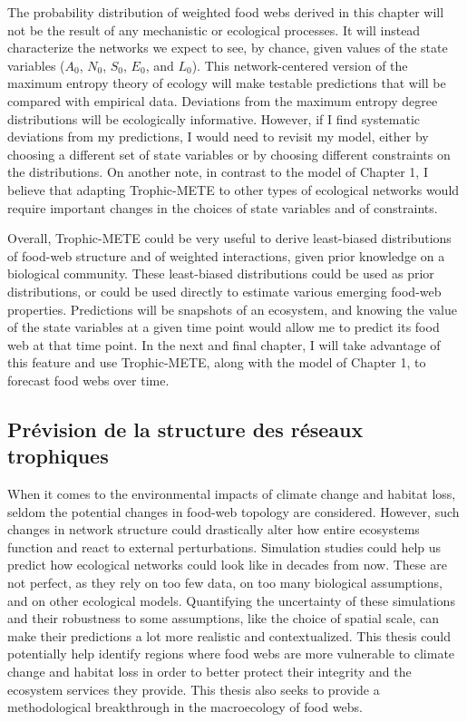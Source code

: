 The probability distribution of weighted food webs derived in this chapter will
not be the result of any mechanistic or ecological processes. It will instead
characterize the networks we expect to see, by chance, given values of the state
variables ($A_0$, $N_0$, $S_0$, $E_0$, and $L_0$). This network-centered version
of the maximum entropy theory of ecology will make testable predictions that
will be compared with empirical data. Deviations from the maximum entropy degree
distributions will be ecologically informative. However, if I find systematic
deviations from my predictions, I would need to revisit my model, either by
choosing a different set of state variables or by choosing different constraints
on the distributions. On another note, in contrast to the model of Chapter 1, I
believe that adapting Trophic-METE to other types of ecological networks would
require important changes in the choices of state variables and of constraints.

Overall, Trophic-METE could be very useful to derive least-biased distributions
of food-web structure and of weighted interactions, given prior knowledge on a
biological community. These least-biased distributions could be used as prior
distributions, or could be used directly to estimate various emerging food-web
properties. Predictions will be snapshots of an ecosystem, and knowing the value
of the state variables at a given time point would allow me to predict its food
web at that time point. In the next and final chapter, I will take advantage of
this feature and use Trophic-METE, along with the model of Chapter 1, to
forecast food webs over time.

\subsection{Prévision de la structure des réseaux trophiques} 

When it comes to the environmental impacts of climate change and
habitat loss, seldom the potential changes in food-web topology are considered.
However, such changes in network structure could drastically alter how entire
ecosystems function and react to external perturbations. Simulation studies
could help us predict how ecological networks could look like in decades from
now. These are not perfect, as they rely on too few data, on too many biological
assumptions, and on other ecological models. Quantifying the uncertainty of
these simulations and their robustness to some assumptions, like the choice of
spatial scale, can make their predictions a lot more realistic and
contextualized. This thesis could potentially help identify regions where food
webs are more vulnerable to climate change and habitat loss in order to better
protect their integrity and the ecosystem services they provide. This thesis
also seeks to provide a methodological breakthrough in the macroecology of food
webs.

